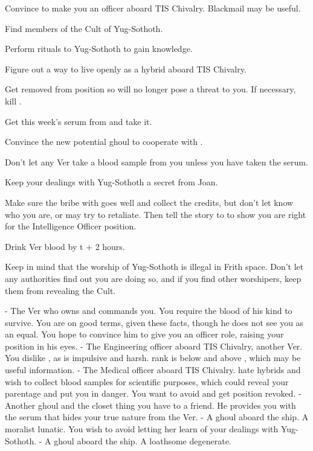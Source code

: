 \documentclass[char]{guildcamp4}
\begin{document}
\begin{itemz}[Goals]
	\item Convince \cVone{} to make you an officer aboard TIS Chivalry. Blackmail may be useful.
	\item Find members of the Cult of Yug-Sothoth. 
	\item Perform rituals to Yug-Sothoth to gain knowledge.
	\item Figure out a way to live openly as a hybrid aboard TIS Chivalry.
	\item Get \cVthree{} removed from \cVthree{\their} position so \cVthree{\they} will no longer pose a threat to you. If necessary, kill \cVthree{\them}.
	\item Get this week's serum from \cJames{} and take it.
	\item Convince the new potential ghoul to cooperate with \cVone{}.
	\item Don't let any Ver take a blood sample from you unless you have taken the serum.
	\item Keep your dealings with Yug-Sothoth a secret from Joan.
	\item Make sure the bribe with \cCbad{} goes well and collect the credits, but don't let \cCbad{\them} know who you are, or \cCbad{\they} may try to retaliate. Then tell the story to \cVone{} to show you are right for the Intelligence Officer position.
	\item Drink Ver blood by t + 2 hours.
\end{itemz}

\begin{itemz}[Notes]
	\item Keep in mind that the worship of Yug-Sothoth is illegal in Frith space. Don't let any authorities find out you are doing so, and if you find other worshipers, keep them from revealing the Cult.
\end{itemz}

\begin{contacts}
	\contact{\cVone{}} - The Ver who owns and commands you. You require the blood of his kind to survive. You are on good terms, given these facts, though he does not see you as an equal. You hope to convince him to give you an officer role, raising your position in his eyes.
	\contact{\cVtwo{}} - The Engineering officer aboard TIS Chivalry, another Ver. You dislike \cVtwo{\them}, as \cVtwo{\they} is impulsive and harsh. \cVtwo{\their} rank is below \cVone{} and above \cVthree{}, which may be useful information.
	\contact{\cVthree{}} - The Medical officer aboard TIS Chivalry. \cVthree{\They} hate hybrids and wish to collect blood samples for scientific purposes, which could reveal your parentage and put you in danger. You want to avoid \cVthree{\them} and get \cVthree{\their} position revoked.
	\contact{\cJames{}} - Another ghoul and the closet thing you have to a friend. He provides you with the serum that hides your true nature from the Ver. 
	\contact{\cJoan{}} - A ghoul aboard the ship. A moralist lunatic. You wish to avoid letting her learn of your dealings with Yug-Sothoth.  
	\contact{\cJulie{}} - A ghoul aboard the ship. A loathsome degenerate. 
\end{contacts}
\end{document}
